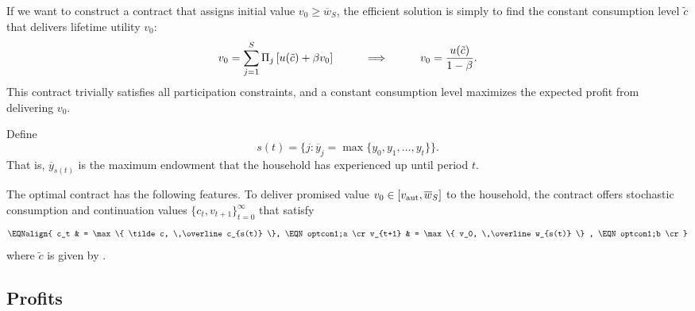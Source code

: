 If we want to construct a contract that assigns initial value
$v_0 \geq \overline w_S$, the efficient solution is simply to
find the constant consumption level $\tilde c$ that delivers lifetime
utility $v_0$:
$$
v_0 = \sum_{j=1}^S \Pi_j \left[u(\tilde c) + \beta v_0 \right]
 \hskip1cm \Longrightarrow \hskip1cm
v_0 = { u(\tilde c) \over 1-\beta}.
$$
This contract trivially satisfies  all participation constraints, and
a constant consumption level maximizes the expected profit from delivering
$v_0$.
\medskip
{}
\smallskip



\noindent
Define
$$ s(t) = \{ j: \overline y_j  = \max\{y_0, y_1, \ldots, y_t\} \}.   $$
That is, $\overline y_{s(t)}$ is the maximum endowment that the
household has experienced up  until period $t$.

The optimal contract has the following features.
To deliver promised value $v_0 \in [v_{\rm aut}, \overline w_S]$ to the household,
the contract offers stochastic consumption and continuation values
$\{c_t, v_{t+1}\}_{t=0}^{\infty}$ that satisfy
$$\EQNalign{ c_t & = \max\{ \tilde c, \,\overline c_{s(t)} \}, \EQN optcon1;a \cr
             v_{t+1} & = \max\{ v_0, \,\overline w_{s(t)} \} , \EQN optcon1;b \cr}$$
where $\tilde c$ is given by .



\subsection{Profits}

